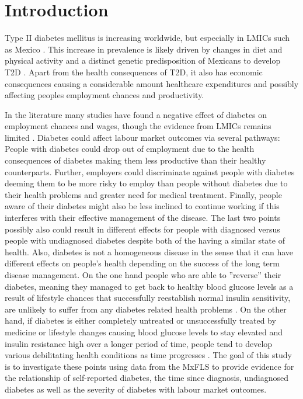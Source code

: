 \section{\noindent \label{sec:Introduction}Introduction}

Type II diabetes mellitus is increasing worldwide, but especially
in \ac{LMICs} such as Mexico \citep{InternationalDiabetesFederation2013}.
This increase in prevalence is likely driven by changes in diet and
physical activity \citep{Barquera2008b,Basu2013} and a distinct genetic
predisposition of Mexicans to develop \ac{T2D} \citep{Williams2013}.
Apart from the health consequences of \ac{T2D}, it also has economic
consequences causing a considerable amount healthcare expenditures
and possibly affecting peoples employment chances and productivity. 

In the literature many studies have found a negative effect of diabetes
on employment chances and wages, though the evidence from \ac{LMICs}
remains limited \citep{Seuring2015a}. Diabetes could affect labour
market outcomes via several pathways: People with diabetes could drop
out of employment due to the health consequences of diabetes making
them less productive than their healthy counterparts. Further, employers
could discriminate against people with diabetes deeming them to be
more risky to employ than people without diabetes due to their health
problems and greater need for medical treatment. Finally, people aware
of their diabetes might also be less inclined to continue working
if this interferes with their effective management of the disease.
The last two points possibly also could result in different effects
for people with diagnosed versus people with undiagnosed diabetes
despite both of the having a similar state of health. Also, diabetes
is not a homogeneous disease in the sense that it can have different
effects on people's health depending on the success of the long term
disease management. On the one hand people who are able to ''reverse''
their diabetes, meaning they managed to get back to healthy blood
glucose levels as a result of lifestyle chances that successfully
reestablish normal insulin sensitivity, are unlikely to suffer from
any diabetes related health problems \citep{Lim2011,Gregg2012}. On
the other hand, if diabetes is either completely untreated or unsuccessfully
treated by medicine or lifestyle changes causing blood glucose levels
to stay elevated and insulin resistance high over a longer period
of time, people tend to develop various debilitating health conditions
as time progresses \citep{Reynoso-Noveron2011}. The goal of this
study is to investigate these points using data from the \acf{MxFLS}
to provide evidence for the relationship of self-reported diabetes,
the time since diagnosis, undiagnosed diabetes as well as the severity
of diabetes with labour market outcomes.

